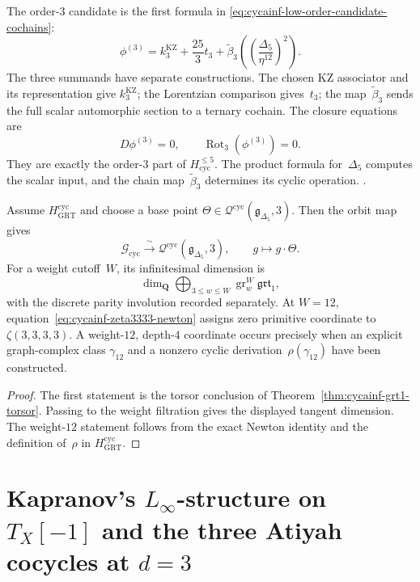 \begin{remark}
\label{rem:cycainf-phi3-cyclic}
The order-$3$ candidate is the first formula in
\eqref{eq:cycainf-low-order-candidate-cochains}:
\[
 \phi^{(3)}
 =k_3^{\mathrm{KZ}}+\frac{25}{3}t_3
 +\widetilde\beta_3\!\left(
   \left(\frac{\Delta_5}{\eta^{12}}\right)^{\!2}\right).
\]
The three summands have separate constructions.  The chosen KZ
associator and its representation give $k_3^{\mathrm{KZ}}$; the
Lorentzian comparison gives~$t_3$; the map~$\widetilde\beta_3$ sends the full
scalar automorphic section to a ternary cochain.  The closure equations
are
\[
 D\phi^{(3)}=0,
 \qquad
 \operatorname{Rot}_3(\phi^{(3)})=0.
\]
They are exactly the order-$3$ part of
$H_{\mathrm{cyc}}^{\leq5}$.  The product formula for~$\Delta_5$
computes the scalar input, and the chain map~$\widetilde\beta_3$ determines its
cyclic operation.
\cite{Costello2007Ainfty,Drinfeld1990,GritsenkoNikulin1998}.
\end{remark}

\begin{corollary}
\label{cor:cycainf-cyclic-orbit}
Assume $H_{\mathrm{GRT}}^{\mathrm{cyc}}$ and choose a base point
$\Theta\in\mathcal Q^{\mathrm{cyc}}(\mathfrak g_{\Delta_5},3)$.  Then
the orbit map gives
\[
 \mathcal G_{\mathrm{cyc}}
 \xrightarrow{\ \sim\ }
 \mathcal Q^{\mathrm{cyc}}(\mathfrak g_{\Delta_5},3),
 \qquad
 g\longmapsto g\cdot\Theta.
\]
For a weight cutoff~$W$, its infinitesimal dimension is
\[
 \dim_{\mathbf Q}
 \bigoplus_{3\leq w\leq W}
 \operatorname{gr}_w^W\mathfrak{grt}_1,
\]
with the discrete parity involution recorded separately.  At
$W=12$, equation~\eqref{eq:cycainf-zeta3333-newton} assigns zero
primitive coordinate to $\zeta(3,3,3,3)$.  A weight-$12$, depth-$4$
coordinate occurs precisely when an explicit graph-complex class
$\gamma_{12}$ and a nonzero cyclic derivation~$\rho(\gamma_{12})$ have
been constructed.
\end{corollary}

\begin{proof}
The first statement is the torsor conclusion of
Theorem~\ref{thm:cycainf-grt1-torsor}.  Passing to the weight
filtration gives the displayed tangent dimension.  The weight-$12$
statement follows from the exact Newton identity and the definition
of~$\rho$ in $H_{\mathrm{GRT}}^{\mathrm{cyc}}$.
\end{proof}

\section{Kapranov's \texorpdfstring{$L_\infty$}{L-inf}-structure on \texorpdfstring{$T_X[-1]$}{T-X[-1]} and the three Atiyah cocycles at \texorpdfstring{$d = 3$}{d = 3}}
\label{sec:cycainf-kapranov-linf}


